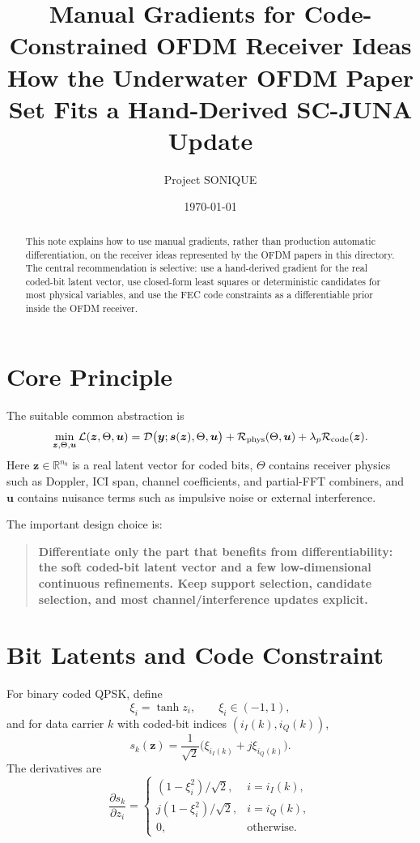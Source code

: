\documentclass[11pt]{article}
\title{Manual Gradients for Code-Constrained OFDM Receiver Ideas\\
\large How the Underwater OFDM Paper Set Fits a Hand-Derived SC-JUNA Update}
\author{Project SONIQUE}
\date{\today}
\newcommand{\R}{\mathbb R}
\begin{document}
\maketitle

\begin{abstract}
This note explains how to use manual gradients, rather than production
automatic differentiation, on the receiver ideas represented by the OFDM
papers in this directory.  The central recommendation is selective: use a
hand-derived gradient for the real coded-bit latent vector, use closed-form
least squares or deterministic candidates for most physical variables, and use
the FEC code constraints as a differentiable prior inside the OFDM receiver.
\end{abstract}

\section{Core Principle}

The suitable common abstraction is
\begin{equation}
  \min_{\bm z,\Theta,\bm u}
  \mathcal L(\bm z,\Theta,\bm u)
  =
  \mathcal D\big(\bm y;\bm s(\bm z),\Theta,\bm u\big)
  +\mathcal R_{\rm phys}(\Theta,\bm u)
  +\lambda_p \mathcal R_{\rm code}(\bm z).
  \label{eq:master}
\end{equation}
Here $\bm z\in\R^{n_b}$ is a real latent vector for coded bits, $\Theta$
contains receiver physics such as Doppler, ICI span, channel coefficients, and
partial-FFT combiners, and $\bm u$ contains nuisance terms such as impulsive
noise or external interference.

The important design choice is:
\begin{quote}
\textbf{Differentiate only the part that benefits from differentiability: the
soft coded-bit latent vector and a few low-dimensional continuous refinements.
Keep support selection, candidate selection, and most channel/interference
updates explicit.}
\end{quote}

\section{Bit Latents and Code Constraint}

For binary coded QPSK, define
\begin{equation}
  \xi_i=\tanh z_i,\qquad \xi_i\in(-1,1),
\end{equation}
and for data carrier $k$ with coded-bit indices $(i_I(k),i_Q(k))$,
\begin{equation}
  s_k(\bm z)=\frac{1}{\sqrt 2}\big(\xi_{i_I(k)}+j\xi_{i_Q(k)}\big).
  \label{eq:qpsk}
\end{equation}
The derivatives are
\begin{equation}
  \frac{\partial s_k}{\partial z_i}
  =
  \begin{cases}
    (1-\xi_i^2)/\sqrt 2, & i=i_I(k),\\
    j(1-\xi_i^2)/\sqrt 2, & i=i_Q(k),\\
    0, & \text{otherwise.}
  \end{cases}
  \label{eq:symbol_derivative}
\end{equation}
\end{document}
